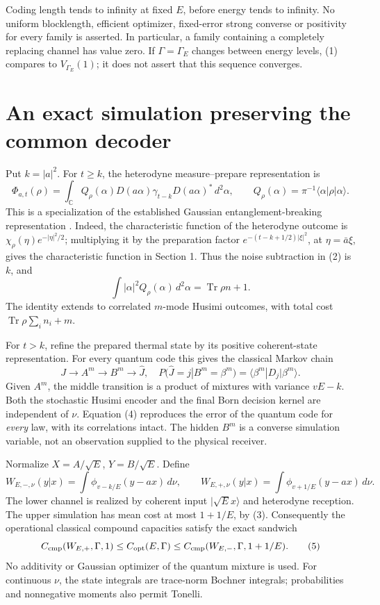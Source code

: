 \documentclass[11pt]{article}
\newcommand{\C}{\mathbb C}
\newcommand{\Tr}{\operatorname{Tr}}
\newcommand{\capq}{C_{\mathrm{opt}}}
\begin{document}
Coding length tends to infinity at fixed \(E\), before energy tends to
infinity. No uniform blocklength, efficient optimizer, fixed-error strong
converse or positivity for every family is asserted. In particular,
a family containing a completely replacing channel has value zero.
If \(\Gamma=\Gamma_E\) changes between energy levels, (1) compares to
\(V_{\Gamma_E}(1)\); it does not assert that this sequence converges.

\section{An exact simulation preserving the common decoder}

Put \(k=|a|^2\). For \(t\geq k\), the heterodyne measure--prepare
representation is
\[
 \Phi_{a,t}(\rho)=\int_\C Q_\rho(\alpha)
           D(a\alpha)\gamma_{t-k}D(a\alpha)^*\,d^2\alpha,\qquad
 Q_\rho(\alpha)=\pi^{-1}\langle\alpha|\rho|\alpha\rangle.       \tag{2}
\]
This is a specialization of the established Gaussian
entanglement-breaking representation \cite{holevoEB,holevoReview}.
Indeed, the characteristic function of the heterodyne outcome is
\(\chi_\rho(\eta)e^{-|\eta|^2/2}\); multiplying it by the preparation
factor \(e^{-(t-k+1/2)|\xi|^2}\), at \(\eta=\bar a\xi\), gives
the characteristic function in Section 1. Thus the noise subtraction
in (2) is \(k\), and
\[
 \int|\alpha|^2Q_\rho(\alpha)\,d^2\alpha=\Tr\rho n+1.          \tag{3}
\]
The identity extends to correlated \(m\)-mode Husimi outcomes, with
total cost \(\Tr\rho\sum_i n_i+m\).

For \(t>k\), refine the prepared thermal state by its positive
coherent-state representation. For every quantum code this gives the
classical Markov chain
\[
 J\longrightarrow A^m\longrightarrow B^m\longrightarrow\widehat J,
 \quad
 P(\widehat J=j|B^m=\beta^m)
   =\langle\beta^m|D_j|\beta^m\rangle .                       \tag{4}
\]
Given \(A^m\), the middle transition is a product of mixtures with
variance \(vE-k\). Both the stochastic Husimi encoder and the final Born
decision kernel are independent of \(\nu\). Equation (4) reproduces
the error of the quantum code for \emph{every} law, with its correlations
intact. The hidden \(B^m\) is a converse simulation variable, not an
observation supplied to the physical receiver.

Normalize \(X=A/\sqrt E\), \(Y=B/\sqrt E\). Define
\[
 W_{E,-,\nu}(y|x)=\int\phi_{v-k/E}(y-ax)\,d\nu,\qquad
 W_{E,+,\nu}(y|x)=\int\phi_{v+1/E}(y-ax)\,d\nu .
\]
The lower channel is realized by coherent input \(|\sqrt E x\rangle\)
and heterodyne reception. The upper simulation has mean cost at most
\(1+1/E\), by (3). Consequently the operational classical compound
capacities satisfy the exact sandwich
\[
 C_{\rm cmp}(W_{E,+},\Gamma,1)
 \leq \capq(E,\Gamma)
 \leq C_{\rm cmp}(W_{E,-},\Gamma,1+1/E).                     \tag{5}
\]
No additivity or Gaussian optimizer of the quantum mixture is used.
For continuous \(\nu\), the state integrals are trace-norm Bochner
integrals; probabilities and nonnegative moments also permit Tonelli.
\end{document}
